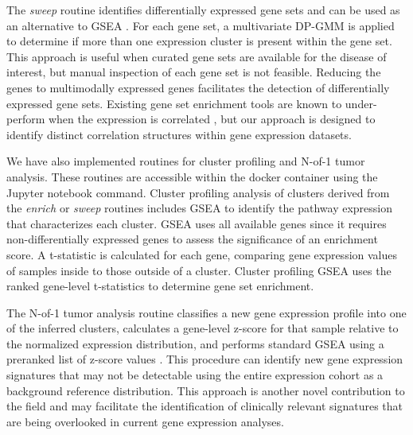\documentclass[10pt,letterpaper]{article}
\begin{document}
The \textit{sweep} routine identifies differentially expressed gene sets and can be used as an alternative to GSEA \cite{subramanianGeneSetEnrichment2005}. For each gene set, a multivariate DP-GMM is applied to determine if more than one expression cluster is present within the gene set. This approach is useful when curated gene sets are available for the disease of interest, but manual inspection of each gene set is not feasible. Reducing the genes to multimodally expressed genes facilitates the detection of differentially expressed gene sets. Existing gene set enrichment tools are known to under-perform when the expression is correlated \cite{tamayoLimitationsSimpleGene2016}, but our approach is designed to identify distinct correlation structures within gene expression datasets.

We have also implemented routines for cluster profiling and N-of-1 tumor analysis. These routines are accessible within the docker container using the Jupyter notebook command. Cluster profiling analysis of clusters derived from the \textit{enrich} or \textit{sweep} routines includes GSEA \cite{korotkevichFastGeneSet2019} to identify the pathway expression that characterizes each cluster. GSEA uses all available genes since it requires non-differentially expressed genes to assess the significance of an enrichment score. A t-statistic is calculated for each gene, comparing gene expression values of samples inside to those outside of a cluster. Cluster profiling GSEA uses the ranked gene-level t-statistics to determine gene set enrichment.

The N-of-1 tumor analysis routine classifies a new gene expression profile into one of the inferred clusters, calculates a gene-level z-score for that sample relative to the normalized expression distribution, and performs standard GSEA using a preranked list of z-score values \cite{korotkevichFastGeneSet2019}. This procedure can identify new gene expression signatures that may not be detectable using the entire expression cohort as a background reference distribution. This approach is another novel contribution to the field and may facilitate the identification of clinically relevant signatures that are being overlooked in current gene expression analyses.
\end{document}
